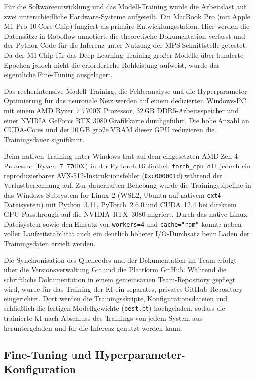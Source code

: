 Für die Softwareentwicklung und das Modell-Training wurde die Arbeitslast auf zwei unterschiedliche 
Hardware-Systeme aufgeteilt. Ein MacBook Pro (mit Apple M1 Pro 10-Core-Chip) fungiert als primäre 
Entwicklungsstation. Hier werden die Datensätze in Roboflow annotiert, die theoretische Dokumentation 
verfasst und der Python-Code für die Inferenz unter Nutzung der \ac{MPS}-Schnittstelle getestet. Da der 
M1-Chip für das Deep-Learning-Training großer Modelle über hunderte Epochen jedoch nicht die erforderliche 
Rohleistung aufweist, wurde das eigentliche Fine-Tuning ausgelagert.

Das rechenintensive Modell-Training, die Fehleranalyse und die Hyperparameter-Optimierung für das neuronale 
Netz werden auf einem dedizierten Windows-PC mit einem AMD Ryzen 7 7700X Prozessor, 
32\,GB DDR5-Arbeitsspeicher und einer NVIDIA GeForce RTX 3080 Grafikkarte durchgeführt. Die hohe Anzahl an 
CUDA-Cores und der 10\,GB große \ac{VRAM} dieser GPU reduzieren die Trainingsdauer signifikant.

Beim nativen Training unter Windows trat auf dem eingesetzten AMD-Zen-4-Prozessor (Ryzen~7~7700X) in der 
PyTorch-Bibliothek \texttt{torch\_cpu.dll} jedoch ein reproduzierbarer AVX-512-Instruktionsfehler 
(\texttt{0xc000001d}) während der Verlustberechnung auf. Zur dauerhaften Behebung wurde die 
Trainingspipeline in das Windows Subsystem for Linux~2 (WSL2, Ubuntu auf nativem \texttt{ext4}-Dateisystem) 
mit Python~3.11, PyTorch~2.6.0 und CUDA~12.4 bei direktem GPU-Passthrough auf die NVIDIA~RTX~3080 migriert. 
Durch das native Linux-Dateisystem sowie den Einsatz von \texttt{workers=4} und \texttt{cache="ram"} 
konnte neben voller Laufzeitstabilität auch ein deutlich höherer I/O-Durchsatz beim Laden der Trainingsdaten 
erzielt werden.

Die Synchronisation des Quellcodes und der Dokumentation im Team erfolgt über die Versionsverwaltung Git 
und die Plattform GitHub. Während die schriftliche Dokumentation in einem gemeinsamen Team-Repository 
gepflegt wird, wurde für das Training der \ac{KI} ein separates, privates GitHub-Repository eingerichtet. 
Dort werden die Trainingsskripte, Konfigurationsdateien und schließlich die fertigen Modellgewichte 
(\texttt{best.pt}) hochgeladen, sodass die trainierte \ac{KI} nach Abschluss des Trainings von jedem 
System aus heruntergeladen und für die Inferenz genutzt werden kann.

\subsection{Fine-Tuning und Hyperparameter-Konfiguration}


